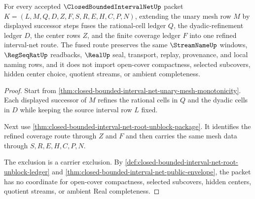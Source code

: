 \begin{theorem}
\label{thm:closed-bounded-interval-net-mesh-refinement-fusion}
For every accepted $\ClosedBoundedIntervalNetUp$ packet $K=(L,M,Q,D,Z,F,S,R,E,H,C,P,N)$, extending the unary mesh row $M$ by displayed successor steps fuses the rational-cell ledger $Q$, the dyadic-refinement ledger $D$, the center rows $Z$, and the finite coverage ledger $F$ into one refined interval-net route. The fused route preserves the same $\StreamNameUp$ windows, $\RegSeqRatUp$ readbacks, $\RealUp$ seal, transport, replay, provenance, and local naming rows, and it does not import open-cover compactness, selected subcovers, hidden center choice, quotient streams, or ambient completeness.
\end{theorem}
\begin{proof}
Start from \autoref{thm:closed-bounded-interval-net-unary-mesh-monotonicity}. Each displayed successor of $M$ refines the rational cells in $Q$ and the dyadic cells in $D$ while keeping the source interval row $L$ fixed.

Next use \autoref{thm:closed-bounded-interval-net-root-unblock-package}. It identifies the refined coverage route through $Z$ and $F$ and then carries the same mesh data through $S,R,E,H,C,P,N$.

The exclusion is a carrier exclusion. By \autoref{def:closed-bounded-interval-net-root-unblock-ledger} and \autoref{thm:closed-bounded-interval-net-public-envelope}, the packet has no coordinate for open-cover compactness, selected subcovers, hidden centers, quotient streams, or ambient Real completeness.
\end{proof}

